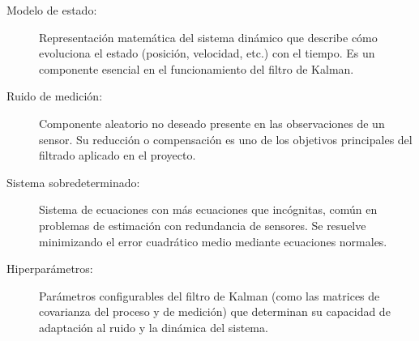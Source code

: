 \begin{description}
\item[Modelo de estado:] Representación matemática del sistema dinámico que describe cómo evoluciona el estado (posición, velocidad, etc.) con el tiempo. Es un componente esencial en el funcionamiento del filtro de Kalman.

\item[Ruido de medición:] Componente aleatorio no deseado presente en las observaciones de un sensor. Su reducción o compensación es uno de los objetivos principales del filtrado aplicado en el proyecto.

\item[Sistema sobredeterminado:] Sistema de ecuaciones con más ecuaciones que incógnitas, común en problemas de estimación con redundancia de sensores. Se resuelve minimizando el error cuadrático medio mediante ecuaciones normales.

\item[Hiperparámetros:] Parámetros configurables del filtro de Kalman (como las matrices de covarianza del proceso y de medición) que determinan su capacidad de adaptación al ruido y la dinámica del sistema.

\end{description}